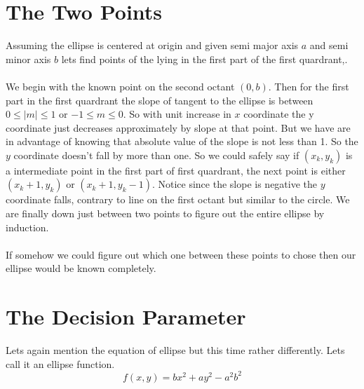 \documentclass[a4paper,12pt,oneside]{book}
\begin{document}
\section{The Two Points} 
   Assuming the ellipse is centered at origin and given semi major axis $a$ and semi minor axis $b$ lets find points of the  lying in the first part of the first quardrant,. \\ \\
   We begin with the known point on the second octant $(0,b)$. Then for the first part in the first quardrant the slope of tangent to the ellipse is between $0 \leq \vert m \vert \leq 1$ or $-1\leq m \leq 0$. So with unit increase in $x$ coordinate the y coordinate just decreases approximately by slope at that point. But we have are in advantage of knowing that absolute value of the slope is not less than 1. So the $y$ coordinate doesn't fall by more than one. So we could safely say if $(x_k,y_k)$ is a intermediate point in the first part of first quardrant, the next point is either  $(x_k+1,y_k)$ or $(x_k+1,y_k-1)$. Notice since the slope is negative the $y$ coordinate falls, contrary to line on the first octant but similar to the circle. We are finally down just between two points to figure out the entire ellipse by induction. \\ \\
   If somehow we could figure out which one between these points to chose then our ellipse would be known completely. 

\section{The Decision Parameter}
Lets again mention the equation of ellipse but this time rather differently. Lets call it an ellipse function.
\begin{equation} \label{eq:ellipsefunction}
	f(x,y)=bx^2+ay^2-a^2b^2
\end{equation}
\end{document}
